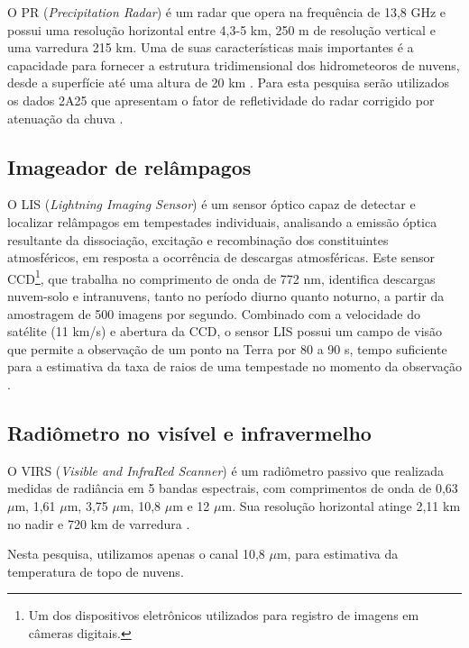 O PR (\textit{Precipitation Radar}) é um radar que opera na frequência de 13,8 GHz e possui uma resolução horizontal entre 4,3-5 km, 250 m de resolução vertical e uma varredura 215 km. Uma de suas características mais importantes é a capacidade para fornecer a estrutura tridimensional dos hidrometeoros de nuvens, desde a superfície até uma altura de 20 km \cite{kummerok1998}. Para esta pesquisa serão utilizados os dados 2A25 que apresentam o fator de refletividade do radar corrigido por atenuação da chuva \cite{2A25}.

\subsection{Imageador de relâmpagos}

O LIS (\textit{Lightning Imaging Sensor}) é um sensor óptico capaz de detectar e localizar relâmpagos em tempestades individuais, analisando a emissão óptica resultante da dissociação, excitação e recombinação dos constituintes atmosféricos, em resposta a ocorrência de descargas atmosféricas. Este sensor CCD\footnote{Um dos dispositivos eletrônicos utilizados para registro de imagens em câmeras digitais.}, que trabalha no comprimento de onda de 772 nm, identifica descargas nuvem-solo e intranuvens, tanto no período diurno quanto noturno, a partir da amostragem de 500 imagens por segundo. Combinado com a velocidade do satélite (11 km/s) e abertura da CCD, o sensor LIS possui um campo de visão que permite a observação de um ponto na Terra por 80 a 90 s, tempo suficiente para a estimativa da taxa de raios de uma tempestade no momento da observação \cite{christianTM,trmmhandbook}.

\subsection{Radiômetro no visível e infravermelho}

O VIRS (\textit{Visible and InfraRed Scanner}) é um radiômetro passivo que realizada medidas de radiância em 5 bandas espectrais, com comprimentos de onda de 0,63 $\mu$m, 1,61 $\mu$m, 3,75 $\mu$m, 10,8 $\mu$m e 12 $\mu$m. Sua resolução horizontal atinge 2,11 km no nadir e 720 km de varredura \cite{trmmhandbook}.

Nesta pesquisa, utilizamos apenas o canal  10,8 $\mu$m, para estimativa da temperatura de topo de nuvens.

